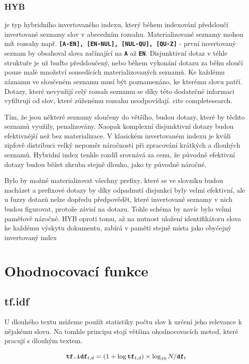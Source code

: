 \documentclass[11pt,letterpaper,oneside,openright]{book}
\newcommand{\bftt}[1]{\texttt{\textbf{#1}}}
\begin{document}
\subsubsection{HYB} je typ hybridního invertovaného indexu, který během
indexování předsloučí invertované seznamy slov v abecedním rozsahu.
Materializované seznamy mohou mít rozsahy např. \bftt{[A-EN], [EN-NUL],
[NUL-QU], [QU-Z]} - první invertovaný seznam by obsahoval slova
začínající na \bftt{A} až \bftt{EN}. Disjunktivní dotaz v téhle
struktuře je už buďto předsloučený, nebo během vykonání dotazu za běhu
sloučí pouze malé množství sousedících materializovaných seznamů. Ke
každému záznamu ve sloučeném seznamu musí být poznamenáno, ke kterému
slovu patří. Dotazy, které nevyužijí celý rozsah seznamu se díky této
dodatečné informaci vyfiltrují od slov, které zúženému rozsahu
neodpovídají. cite completesearch.

Tím, že jsou některé seznamy sloučeny do většího, budou dotazy, které by těchto
seznamů využily, penalizovány. Naopak komplexní disjunktivní dotazy budou
efektivnější než bez materializace. V klasickém invertovaném indexu je kvůli
zipfově distribuci velký nepoměr náročnosti při zpracování krátkých a dlouhých
seznamů. Hybridní index tenhle rozdíl srovnává za cenu, že původně efektivní
dotazy budou běžet zhruba stejně dlouho, jako ty původně náročné.

Bylo by možné materializovat všechny prefixy, které se ve slovníku budou
nacházet a prefixové dotazy by díky odpadnutí disjunkcí byly velmi efektivní,
ale u fuzzy dotazů nelze dopředu předpovědět, které invertované seznamy v nich
budou figurovat, protože závisí na dotazu. Tohle schéma by navíc bylo velmi
paměťově náročné. HYB oproti tomu, až na nutnost uložení identifikátoru slova
ke každému výskytu dokumentu, zabírá v paměti stejně místa jako obyčejný
invertovaný index


\section{Ohodnocovací funkce}

\subsection{tf.idf}
U dlouhého textu můžeme použít statistiky počtu slov k určení jeho
relevance k nějakému slovu. Na tomhle principu stojí většina
ohodnocovacích metod, které pracují s dlouhým textem.

$$
\bftt{tf.idf}_{t, d} = (1 + \log \bftt{tf}_{t, d}) \times \log_{10} N / \bftt{df}_{t}
$$
\end{document}

